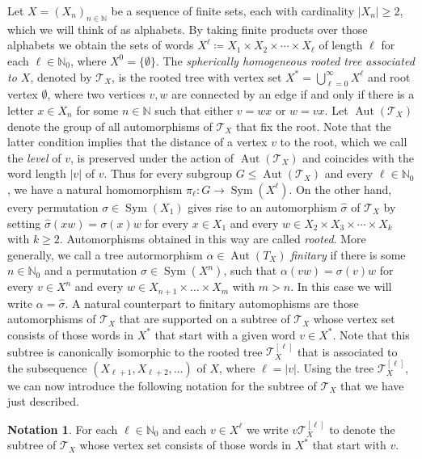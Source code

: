 \documentclass[a4paper]{amsart}
\renewcommand\leq\leqslant
\renewcommand\geq\geqslant
\numberwithin{equation}{section}
\theoremstyle{definition}
\newtheorem{notation}[theorem]{Notation}
\theoremstyle{remark}
\newcommand{\N}{\mathbb{N}}
\DeclareMathOperator{\Aut}{Aut}
\DeclareMathOperator{\Sym}{Sym}
\newcommand{\abs}[1]{| #1 |}
\newcommand{\T}{\mathcal{T}}
\newcommand{\defeq}\coloneqq%
\begin{document}
Let $X = (X_n)_{n \in \N}$ be a sequence of finite sets, each with cardinality $\abs{X_n} \geq 2$, which we will think of as alphabets.
By taking finite products over those alphabets we obtain the sets of words $X^{\ell} \defeq X_1 \times X_2 \times \cdots \times X_{\ell}$ of length $\ell$ for each $\ell \in \N_0$, where $X^{0} = \{\emptyset\}$.
The \emph{spherically homogeneous rooted tree associated to $X$}, denoted by $\T_X$, is the rooted tree with vertex set $X^{\ast} = \bigcup%
_{\ell=0}^{\infty} X^{\ell}$ and root vertex $\emptyset$, where two vertices $v,w$ are connected by an edge if and only if there is a letter $x \in X_n$ for some $n \in \N$ such that either $v = wx$ or $w = vx$.
Let $\Aut(\T_X)$ denote the group of all automorphisms of $\T_X$ that fix the root. %
Note that the latter condition implies that the distance of a vertex $v$ to the root, which we call the \emph{level} of $v$, is preserved under the action of $\Aut(\T_X)$ and coincides with the word length $\abs{v}$ of $v$.
Thus for every subgroup $G \leq \Aut(\T_X)$ and every $\ell \in \N_0$, we have a natural homomorphism $\pi_{\ell} \colon G \rightarrow \Sym(X^{\ell})$.
On the other hand, every permutation $\sigma \in \Sym(X_{1})$ gives rise to an automorphism $\widehat{\sigma}$ of $\T_X$ by setting $\widehat{\sigma}(xw) = \sigma(x)w$ for every $x \in X_1$ and every $w \in X_2 \times X_3 \times \cdots \times X_{k}$ with $k \geq 2$.
Automorphisms obtained in this way are called \emph{rooted}.
More generally, we call a tree autormorphism $\alpha \in \Aut(T_X)$ \emph{finitary} if there is some $n \in \N_0$ and a permutation $\sigma \in \Sym(X^n)$, such that $\alpha(vw) = \sigma(v)w$ for every $v \in X^n$ and every $w \in X_{n+1} \times \ldots \times X_m$ with $m > n$.
In this case we will write $\alpha = \widehat{\sigma}$.
A natural counterpart to finitary automophisms are those automorphisms of $\T_X$ that are supported on a subtree of $\T_X$ whose vertex set consists of those words in $X^{\ast}$ that start with a given word $v \in X^{\ast}$.
Note that %
this
subtree is canonically isomorphic to the %
rooted tree $\T_X^{[\ell]}$ that is associated to the subsequence $(X_{\ell+1}, X_{\ell+2}, \ldots)$ of $X$, where $\ell = |v|$.
Using the tree $\T_X^{[\ell]}$, we can now introduce the following notation for the subtree of $\T_X$ that we have just described.
\begin{notation}\label{not:vTXl}
For each $\ell \in \N_0$ and each $v \in X^{\ell}$ we write $v\T_X^{[\ell]}$ to denote the subtree of $\T_X$ whose vertex set consists of those words in $X^{\ast}$ that start with $v$.
\end{notation}
\end{document}
